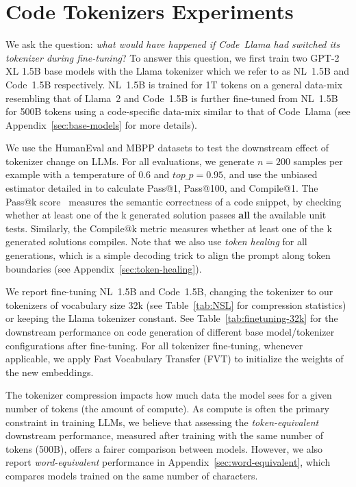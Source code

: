 \section{Code Tokenizers Experiments}
\label{sec:experiments}

We ask the question: \textit{what would have happened if Code~Llama had switched its tokenizer during fine-tuning}? To answer this question, we first train two GPT-2 XL 1.5B base models \cite{gpt2} with the Llama tokenizer which we refer to as NL~1.5B and Code~1.5B respectively. NL~1.5B is trained for 1T tokens on a general data-mix resembling that of Llama~2 and Code~1.5B is further fine-tuned from NL~1.5B for 500B tokens using a code-specific data-mix similar to that of Code~Llama (see Appendix~\ref{sec:base-models} for more details).

We use the HumanEval \cite{humaneval} and MBPP \cite{mbpp} datasets to test the downstream effect of tokenizer change on LLMs. For all evaluations, we generate $n=200$ samples per example with a temperature of $0.6$ and $top\_p=0.95$, and use the unbiased estimator detailed in \citet{humaneval} to calculate Pass@1, Pass@100, and Compile@1. The Pass@k score~\cite{kulal2019spoc,roziere2020unsupervised,humaneval} measures the semantic correctness of a code snippet, by checking whether at least one of the k generated solution passes \textbf{all} the available unit tests. Similarly, the Compile@k metric measures whether at least one of the k generated solutions compiles. Note that we also use \textit{token healing} for all generations, which is a simple decoding trick to align the prompt along token boundaries (see Appendix~\ref{sec:token-healing}).

We report fine-tuning NL~1.5B and Code~1.5B, changing the tokenizer to our tokenizers of vocabulary size 32k (see Table~\ref{tab:NSL} for compression statistics) or keeping the Llama tokenizer constant. See Table~\ref{tab:finetuning-32k} for the downstream performance on code generation of different base model/tokenizer configurations after fine-tuning. For all tokenizer fine-tuning, whenever applicable, we apply Fast Vocabulary Transfer (FVT) \cite{FVT} to initialize the weights of the new embeddings.

The tokenizer compression impacts how much data the model sees for a given number of tokens (the amount of compute). As compute is often the primary constraint in training LLMs, we believe that assessing the \textit{token-equivalent} downstream performance, measured after training with the same number of tokens (500B), offers a fairer comparison between models. However, we also report \textit{word-equivalent} performance in Appendix~\ref{sec:word-equivalent}, which compares models trained on the same number of characters.

